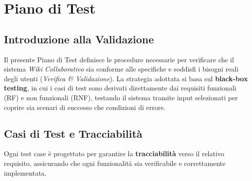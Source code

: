 \chapter{Piano di Test}

\section{Introduzione alla Validazione}
\noindent Il presente Piano di Test definisce le procedure necessarie per verificare che il sistema \textit{Wiki Collaborativo} sia conforme alle specifiche e soddisfi i bisogni reali degli utenti (\textit{Verifica \& Validazione}). La strategia adottata si basa sul \textbf{black-box testing}, in cui i casi di test sono derivati direttamente dai requisiti funzionali (RF) e non funzionali (RNF), testando il sistema tramite input selezionati per coprire sia scenari di successo che condizioni di errore.

\section{Casi di Test e Tracciabilità}
\noindent Ogni test case è progettato per garantire la \textbf{tracciabilità} verso il relativo requisito, assicurando che ogni funzionalità sia verificabile e correttamente implementata.

